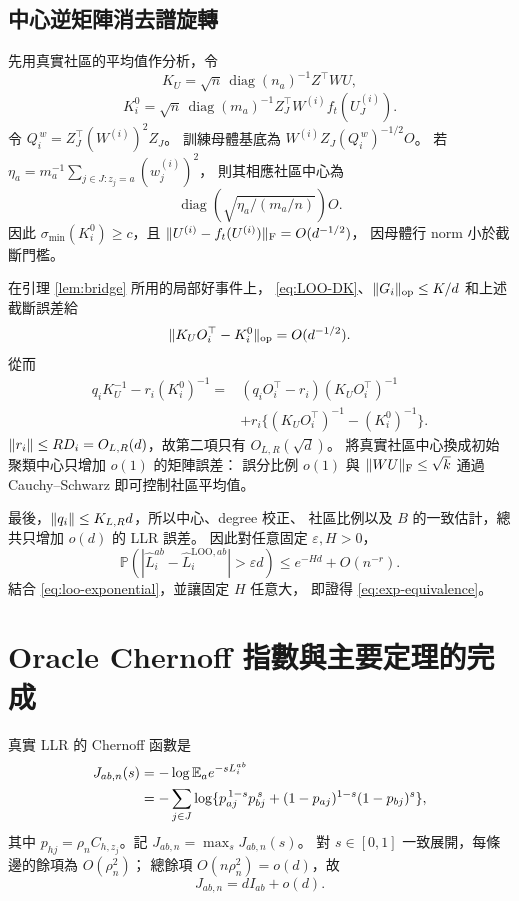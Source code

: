 \documentclass[11pt,a4paper]{article}
\theoremstyle{zhplain}
\numberwithin{equation}{section}
\newcommand{\E}{\mathbb E}
\newcommand{\PP}{\mathbb P}
\newcommand{\diag}{\operatorname{diag}}
\newcommand{\op}{\mathrm{op}}
\newcommand{\Frob}{\mathrm{F}}
\DeclarePairedDelimiter{\norm}{\lVert}{\rVert}
\begin{document}
\subsection{中心逆矩陣消去譜旋轉}
先用真實社區的平均值作分析，令
\[
 K_U=\sqrt n\,\diag(n_a)^{-1}Z^\top WU,
\]
\[
 K_i^0=\sqrt n\,\diag(m_a)^{-1}
 Z_J^\top W^{(i)}f_t(U_J^{(i)}).
\]
令 \(Q_i^{\,w}=Z_J^\top(W^{(i)})^2Z_J\)。
訓練母體基底為 \(W^{(i)}Z_J(Q_i^{\,w})^{-1/2}O\)。
若
\(\eta_a=m_a^{-1}\sum_{j\in J:z_j=a}(w_j^{(i)})^2\)，
則其相應社區中心為
\[
 \diag\!\left(\sqrt{\eta_a/(m_a/n)}\right)O.
\]
因此 \(\sigma_{\min}(K_i^0)\ge c\)，且
\(\norm{U^{(i)}-f_t(U^{(i)})}_{\Frob}=O(d^{-1/2})\)，
因母體行 norm 小於截斷門檻。

在引理 \ref{lem:bridge} 所用的局部好事件上，
\eqref{eq:LOO-DK}、\(\norm{G_i}_{\op}\le K/d\) 和上述截斷誤差給
\[
 \norm{K_UO_i^\top-K_i^0}_{\op}=O(d^{-1/2}).
\]
從而
\begin{align*}
 q_iK_U^{-1}-r_i(K_i^0)^{-1}
 ={}&(q_iO_i^\top-r_i)(K_UO_i^\top)^{-1}\\
 &+r_i\{(K_UO_i^\top)^{-1}-(K_i^0)^{-1}\}.
\end{align*}
\(\norm{r_i}\le RD_i=O_{L,R}(d)\)，故第二項只有 \(O_{L,R}(\sqrt d)\)。
將真實社區中心換成初始聚類中心只增加 \(o(1)\) 的矩陣誤差：
誤分比例 \(o(1)\) 與 \(\norm{WU}_{\Frob}\le\sqrt k\)
通過 Cauchy--Schwarz 即可控制社區平均值。

最後，\(\norm{q_i}\le K_{L,R}d\)，所以中心、degree 校正、
社區比例以及 \(B\) 的一致估計，總共只增加 \(o(d)\) 的 LLR 誤差。
因此對任意固定 \(\varepsilon,H>0\)，
\begin{equation}
 \PP\!\left(
 |\widehat L_i^{ab}-\widehat L_i^{\mathrm{LOO},ab}|
 >\varepsilon d\right)
 \le e^{-Hd}+O(n^{-r}).
 \label{eq:LLR-bridge}
\end{equation}
結合 \eqref{eq:loo-exponential}，並讓固定 \(H\) 任意大，
即證得 \eqref{eq:exp-equivalence}。

\section{Oracle Chernoff 指數與主要定理的完成}
\label{sec:risk}
真實 LLR 的 Chernoff 函數是
\begin{align}
 J_{ab,n}(s)
 &=-\log\E_a e^{-sL_i^{ab}}\notag\\
 &=-\sum_{j\in J}
 \log\{p_{aj}^{\,1-s}p_{bj}^{\,s}
 +(1-p_{aj})^{1-s}(1-p_{bj})^s\},
 \label{eq:exact-Chernoff}
\end{align}
其中 \(p_{hj}=\rho_n C_{h,z_j}\)。記 \(J_{ab,n}=\max_sJ_{ab,n}(s)\)。
對 \(s\in[0,1]\) 一致展開，每條邊的餘項為 \(O(\rho_n^2)\)；
總餘項 \(O(n\rho_n^2)=o(d)\)，故
\begin{equation}
 J_{ab,n}=dI_{ab}+o(d).
 \label{eq:J-expansion}
\end{equation}
\end{document}
